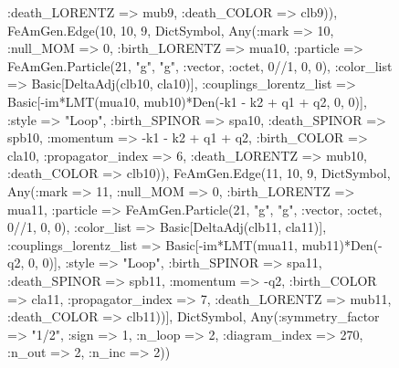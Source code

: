 \documentclass{revtex4}
\begin{document}
\begin{figure}[!htb]
\begin{center}
{:death_LORENTZ => mub9, :death_COLOR => clb9)), FeAmGen.Edge(10, 10, 9, Dict{Symbol, Any}(:mark => 10, :null_MOM => 0, :birth_LORENTZ => mua10, :particle => FeAmGen.Particle(21, "g", "g", :vector, :octet, 0//1, 0, 0), :color_list => Basic[DeltaAdj(clb10, cla10)], :couplings_lorentz_list => Basic[-im*LMT(mua10, mub10)*Den(-k1 - k2 + q1 + q2, 0, 0)], :style => "Loop", :birth_SPINOR => spa10, :death_SPINOR => spb10, :momentum => -k1 - k2 + q1 + q2, :birth_COLOR => cla10, :propagator_index => 6, :death_LORENTZ => mub10, :death_COLOR => clb10)), FeAmGen.Edge(11, 10, 9, Dict{Symbol, Any}(:mark => 11, :null_MOM => 0, :birth_LORENTZ => mua11, :particle => FeAmGen.Particle(21, "g", "g", :vector, :octet, 0//1, 0, 0), :color_list => Basic[DeltaAdj(clb11, cla11)], :couplings_lorentz_list => Basic[-im*LMT(mua11, mub11)*Den(-q2, 0, 0)], :style => "Loop", :birth_SPINOR => spa11, :death_SPINOR => spb11, :momentum => -q2, :birth_COLOR => cla11, :propagator_index => 7, :death_LORENTZ => mub11, :death_COLOR => clb11))], Dict{Symbol, Any}(:symmetry_factor => "1/2", :sign => 1, :n_loop => 2, :diagram_index => 270, :n_out => 2, :n_inc => 2)) 
}
\end{center}
\end{figure}
\end{document}
